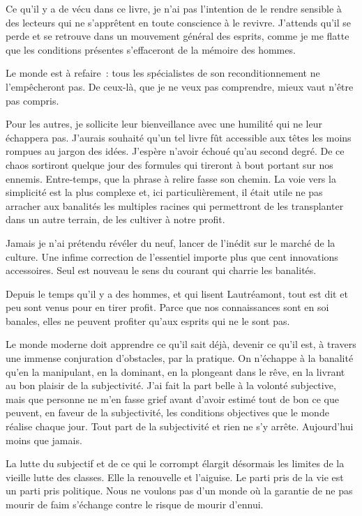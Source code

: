 \documentclass[french,twoside]{book} %
\begin{document}
\noindent Ce qu’il y a de vécu dans ce livre, je n’ai pas l’intention de le rendre sensible à des lecteurs qui ne s’apprêtent en toute conscience à le revivre. J’attends qu’il se perde et se retrouve dans un mouvement général des esprits, comme je me flatte que les conditions présentes s’effaceront de la mémoire des hommes.\par
Le monde est à refaire : tous les spécialistes de son reconditionnement ne l’empêcheront pas. De ceux-là, que je ne veux pas comprendre, mieux vaut n’être pas compris.\par
Pour les autres, je sollicite leur bienveillance avec une humilité qui ne leur échappera pas. J’aurais souhaité qu’un tel livre fût accessible aux têtes les moins rompues au jargon des idées. J’espère n’avoir échoué qu’au second degré. De ce chaos sortiront quelque jour des formules qui tireront à bout portant sur nos ennemis. Entre-temps, que la phrase à relire fasse son chemin. La voie vers la simplicité est la plus complexe et, ici particulièrement, il était utile ne pas arracher aux banalités les multiples racines qui permettront de les transplanter dans un autre terrain, de les cultiver à notre profit.\par
Jamais je n’ai prétendu révéler du neuf, lancer de l’inédit sur le marché de la culture. Une infime correction de l’essentiel importe plus que cent innovations accessoires. Seul est nouveau le sens du courant qui charrie les banalités.\par
Depuis le temps qu’il y a des hommes, et qui lisent Lautréamont, tout est dit et peu sont venus pour en tirer profit. Parce que nos connaissances sont en soi banales, elles ne peuvent profiter qu’aux esprits qui ne le sont pas.\par
Le monde moderne doit apprendre ce qu’il sait déjà, devenir ce qu’il est, à travers une immense conjuration d’obstacles, par la pratique. On n’échappe à la banalité qu’en la manipulant, en la dominant, en la plongeant dans le rêve, en la livrant au bon plaisir de la subjectivité. J’ai fait la part belle à la volonté subjective, mais que personne ne m’en fasse grief avant d’avoir estimé tout de bon ce que peuvent, en faveur de la subjectivité, les conditions objectives que le monde réalise chaque jour. Tout part de la subjectivité et rien ne s’y arrête. Aujourd’hui moins que jamais.\par
La lutte du subjectif et de ce qui le corrompt élargit désormais les limites de la vieille lutte des classes. Elle la renouvelle et l’aiguise. Le parti pris de la vie est un parti pris politique. Nous ne voulons pas d’un monde où la garantie de ne pas mourir de faim s’échange contre le risque de mourir d’ennui.\par
\end{document}
